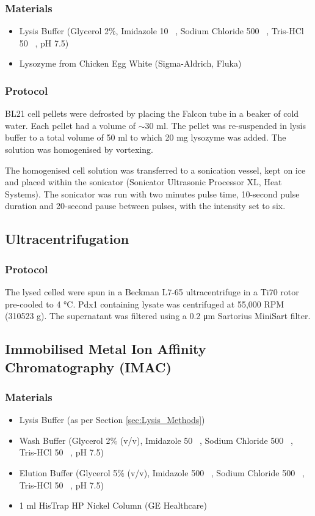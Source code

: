 			\subsubsection{Materials}
				\begin{itemize}
				\item Lysis Buffer (Glycerol 2\%, Imidazole 10 \si{\milli\molar}, Sodium Chloride 500 \si{\milli\molar}, Tris-HCl 50 \si{\milli\molar}, pH 7.5) 
				\item Lysozyme from Chicken Egg White (Sigma-Aldrich, Fluka)
				\end{itemize}
			\subsubsection{Protocol}
			BL21 cell pellets were defrosted by placing the Falcon tube in a beaker of cold water. Each pellet had a volume of $\sim$30 \si{\milli\litre}. The pellet was re-suspended in lysis buffer to a total volume of 50 \si{\milli\litre} to which 20 mg lysozyme was added. The solution was homogenised by vortexing.\par
			The homogenised cell solution was transferred to a sonication vessel, kept on ice and placed within the sonicator (Sonicator Ultrasonic Processor XL, Heat Systems). The sonicator was run with two minutes pulse time, 10-second pulse duration and 20-second pause between pulses, with the intensity set to six.
			
		\subsection*{Ultracentrifugation}
		\subsubsection{Protocol}
		The lysed celled were spun in a Beckman L7-65 ultracentrifuge in a Ti70 rotor pre-cooled to 4 \si{\degreeCelsius}. Pdx1 containing lysate was centrifuged at 55,000 RPM (310523 g). The supernatant was filtered using a 0.2 \si{\micro\meter} Sartorius MiniSart filter. \newpage
		
		\subsection*{Immobilised Metal Ion Affinity Chromatography (IMAC)}
		
		\subsubsection{Materials}
				\begin{itemize}
				\item Lysis Buffer (as per Section \ref{sec:Lysis_Methods})
				\item Wash Buffer (Glycerol 2\% (v/v), Imidazole 50 \si{\milli\molar}, Sodium Chloride 500 \si{\milli\molar}, Tris-HCl 50 \si{\milli\molar}, pH 7.5) 
				\item Elution Buffer (Glycerol 5\% (v/v), Imidazole 500 \si{\milli\molar}, Sodium Chloride 500 \si{\milli\molar}, Tris-HCl 50 \si{\milli\molar}, pH 7.5)
				\item 1 \si{\milli\litre} HisTrap HP Nickel Column (GE Healthcare)
				\end{itemize}
